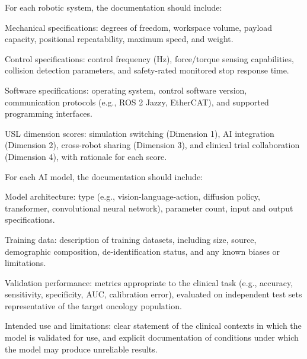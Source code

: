 For each robotic system, the documentation should include:

\begin{description}[leftmargin=2.5cm,style=sameline]

\item[(a)] Mechanical specifications: degrees of freedom, workspace volume, payload capacity, positional repeatability, maximum speed, and weight.

\item[(b)] Control specifications: control frequency (Hz), force/torque sensing capabilities, collision detection parameters, and safety-rated monitored stop response time.

\item[(c)] Software specifications: operating system, control software version, communication protocols (e.g., ROS 2 Jazzy, EtherCAT), and supported programming interfaces.

\item[(d)] USL dimension scores: simulation switching (Dimension 1), AI integration (Dimension 2), cross-robot sharing (Dimension 3), and clinical trial collaboration (Dimension 4), with rationale for each score.

\end{description}

For each AI model, the documentation should include:

\begin{description}[leftmargin=2.5cm,style=sameline]

\item[(a)] Model architecture: type (e.g., vision-language-action, diffusion policy, transformer, convolutional neural network), parameter count, input and output specifications.

\item[(b)] Training data: description of training datasets, including size, source, demographic composition, de-identification status, and any known biases or limitations.

\item[(c)] Validation performance: metrics appropriate to the clinical task (e.g., accuracy, sensitivity, specificity, AUC, calibration error), evaluated on independent test sets representative of the target oncology population.

\item[(d)] Intended use and limitations: clear statement of the clinical contexts in which the model is validated for use, and explicit documentation of conditions under which the model may produce unreliable results.

\end{description}

